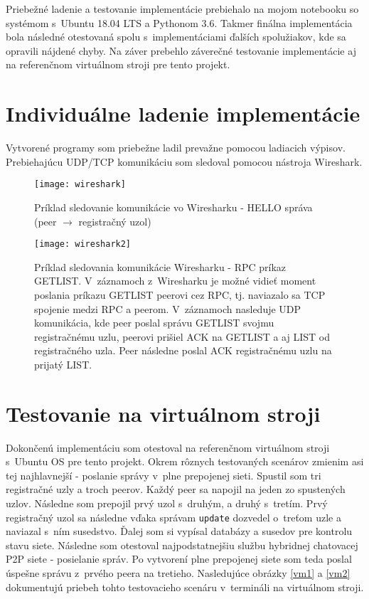 Priebežné ladenie a testovanie implementácie prebiehalo na mojom notebooku so systémom s~Ubuntu 18.04 LTS a Pythonom 3.6. Takmer finálna implementácia bola následné otestovaná spolu s~implementáciami ďalších spolužiakov, kde sa opravili nájdené chyby. Na záver prebehlo záverečné testovanie implementácie aj na referenčnom virtuálnom stroji pre tento projekt.

\section{Individuálne ladenie implementácie}
Vytvorené programy som priebežne ladil prevažne pomocou ladiacich výpisov. Prebiehajúcu UDP/TCP komunikáciu som sledoval pomocou nástroja Wireshark.

\begin{figure}[H]
	\texttt{[image: wireshark]}
	\caption{Príklad sledovanie komunikácie vo Wiresharku \-- HELLO správa (peer $\rightarrow$ registračný uzol)}
\end{figure}

\begin{figure}[H]
	\texttt{[image: wireshark2]}
	\caption{Príklad sledovania komunikácie Wiresharku \-- RPC príkaz GETLIST. V~záznamoch z~Wiresharku je možné vidieť moment poslania príkazu GETLIST peerovi cez RPC, tj. naviazalo sa TCP spojenie medzi RPC a peerom. V~záznamoch nasleduje UDP komunikácia, kde peer poslal správu GETLIST svojmu registračnému uzlu, peerovi prišiel ACK na GETLIST a aj LIST od registračného uzla. Peer následne poslal ACK registračnému uzlu na prijatý LIST.}
\end{figure}

\section{Testovanie na virtuálnom stroji}

Dokončenú implementáciu som otestoval na referenčnom virtuálnom stroji s~Ubuntu OS pre tento projekt. Okrem rôznych testovaných scenárov zmienim asi tej najhlavnejší \-- poslanie správy v~plne prepojenej sieti. Spustil som tri registračné uzly a troch peerov. Každý peer sa napojil na jeden zo spustených uzlov. Následne som prepojil prvý uzol s~druhým, a druhý s~tretím. Prvý registračný uzol sa následne vďaka správam \texttt{update} dozvedel o~treťom uzle a naviazal s~ním susedstvo. Ďalej som si vypísal databázy a susedov pre kontrolu stavu siete. Následne som otestoval najpodstatnejšiu službu hybridnej chatovacej P2P siete \-- posielanie správ. Po vytvorení plne prepojenej siete som teda poslal úspešne správu z~prvého peera na tretieho. Nasledujúce obrázky \ref{vm1} a \ref{vm2} dokumentujú priebeh tohto testovacieho scenáru v~termináli na virtuálnom stroji.


